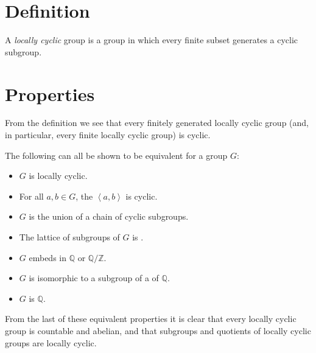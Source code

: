 \documentclass[12pt]{article}
\def\genby#1{{\left\langle #1\right\rangle}}
\newcommand{\Q}[0]{\mathbb{Q}}
\newcommand{\Z}[0]{\mathbb{Z}}
\begin{document}

\section*{Definition}

A {\em locally cyclic} group is a group in which every finite subset generates a cyclic subgroup.

\section*{Properties}

From the definition we see that every finitely generated locally cyclic group
(and, in particular, every finite locally cyclic group) is cyclic.

The following can all be shown to be equivalent for a group $G$:

\begin{itemize}
\item $G$ is locally cyclic.
\item For all $a,b\in G$, the  $\genby{a,b}$ is cyclic.
\item $G$ is the union of a chain of cyclic subgroups.
\item The lattice of subgroups of $G$ is .
\item $G$ embeds in $\Q$ or $\Q/\Z$.
\item $G$ is isomorphic to a subgroup of a  of $\Q$.
\item $G$ is  $\Q$.
\end{itemize}

From the last of these equivalent properties it is clear that
every locally cyclic group is countable and abelian,
and that subgroups and quotients
of locally cyclic groups are locally cyclic.
\end{document}

